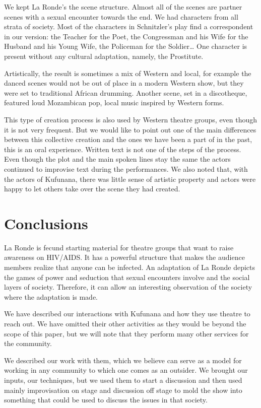 \documentclass[article,twocolumn]{memoir}
\begin{document}
We kept La Ronde's the scene structure. Almost all of the scenes are partner
scenes with a sexual encounter towards the end. We had characters from all
strata of society. Most of the characters in Schnitzler's play find a
correspondent in our version: the Teacher for the Poet, the Congressman and his
Wife for the Husband and his Young Wife, the Policeman for the Soldier\ldots
One character is present without any cultural adaptation, namely, the
Prostitute.

Artistically, the result is sometimes a mix of Western and local, for example
the danced scenes would not be out of place in a modern Western show, but they
were set to traditional African drumming. Another scene, set in a discotheque,
featured loud Mozambican pop, local music inspired by Western forms.

This type of creation process is also used by Western theatre groups, even
though it is not very frequent. But we would like to point out one of the main
differences between this collective creation and the ones we have been a part
of in the past, this is an oral experience. Written text is not one of the
steps of the process. Even though the plot and the main spoken lines stay the
same the actors continued to improvise text during the performances. We also
noted that, with the actors of Kufunana, there was little sense of artistic
property and actors were happy to let others take over the scene they had
created.

\chapter{Conclusions}

La Ronde is fecund starting material for theatre groups that want to raise
awareness on HIV/AIDS. It has a powerful structure that makes the audience
members realize that anyone can be infected. An adaptation of La Ronde depicts
the games of power and seduction that sexual encounters involve and the social
layers of society. Therefore, it can allow an interesting observation of the
society where the adaptation is made.

We have described our interactions with Kufunana and how they use theatre to
reach out. We have omitted their other activities as they would be beyond the
scope of this paper, but we will note that they perform many other services for
the community.

We described our work with them, which we believe can serve as a model for
working in any community to which one comes as an outsider. We brought our
inputs, our techniques, but we used them to start a discussion and then used
mainly improvisation on stage and discussion off stage to mold the show into
something that could be used to discuss the issues in that society.
\end{document}
